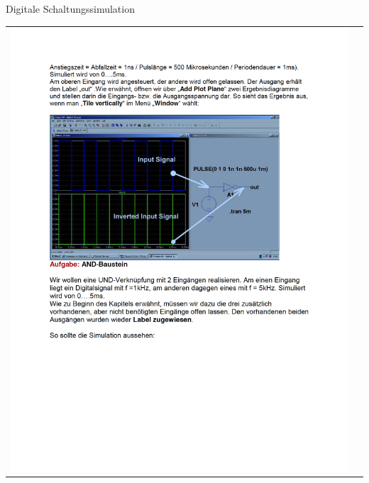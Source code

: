 \begin{frame}[t]{Digitale Schaltungssimulation}
\begin{spacing}{0.9}
\begin{tiny}
\begin{table}[h!]
\begin{tabular}{p{5cm} p{5cm}}
\begin{minipage}{0.5\textwidth}
                        \includegraphics[width=\linewidth]{pictures/legacy/digi_2.png}
                    \end{minipage}
                \end{tabular}
            \end{table}
        \end{tiny} \end{spacing}
\end{frame}

